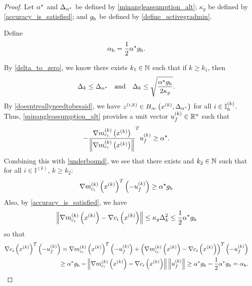 \begin{proof}

Let 
${ \alpha^{\star} }$ and ${\Delta_{\alpha^{\star}}}$ be defined by \cref{minangleassumption_alt};
$\kappa_g$ be defined by \cref{accuracy_is_satisfied}; 
and ${ g_{\textrm{h}} }$ be defined by \cref{define_activegradmin}.

Define 
\begin{align}
{ \alpha_{\textrm{h}} } = \frac 1 2 { \alpha^{\star} } { g_{\textrm{h}} }. \label{define_minactivealpha}
\end{align}

By \cref{delta_to_zero}, we know there exists $k_1 \in \mathbb N$ such that if $k \ge k_1$, then
\begin{align*}
\Delta_k \le {\Delta_{\alpha^{\star}}} \quad \textrm{and} \quad  \Delta_k \le \sqrt{\frac {{ \alpha^{\star} } { g_{\textrm{h}} }} {2 \kappa_g}}.
\end{align*}
By \cref{doesntreallyneedtobesaid}, we have ${z^{(i, k)}} \in B_{\infty}\left(x^{(k)}, {\Delta_{\alpha^{\star}}} \right)$ for all $i \in { \mathbb I_h^{(k)} }$.
Thus, \cref{minangleassumption_alt} provides a unit vector ${u^{(k)}_f}\in\mathbb R^n$ such that
\begin{align*}
-\frac {{\nabla m_{c_i}^{(k)}\left(x^{(k)}\right)}}{\left\|{\nabla m_{c_i}^{(k)}\left(x^{(k)}\right)}\right\|} ^T{u^{(k)}_f} \ge { \alpha^{\star} }.
\end{align*}
Combining this with \cref{underbound}, we see that there exists and $k_2 \in \mathbb N$ such that for all $i \in \mathbb I^{(k)}$, $k \ge k_2$:
\begin{align*}
 {\nabla m_{c_i}^{(k)}\left(x^{(k)}\right)}^T\left(-{u^{(k)}_f}\right) \ge { \alpha^{\star} } { g_{\textrm{h}} }
\end{align*}
Also, by \cref{accuracy_is_satisfied}, we have
\begin{align*}
\left\|{\nabla m_{c_i}^{(k)}\left(x^{(k)}\right)} - \nabla c_i\left(x^{(k)}\right) \right\| \le \kappa_g \Delta_k^2 \le \frac 1 2 { \alpha^{\star} } { g_{\textrm{h}} }
\end{align*}
so that
\begin{align*}
\nabla c_i\left(x^{(k)}\right)^T \left(-{u^{(k)}_f}\right) = 
{\nabla m_{c_i}^{(k)}\left(x^{(k)}\right)}^T\left(-{u^{(k)}_f}\right) + \left({\nabla m_{c_i}^{(k)}\left(x^{(k)}\right)} - \nabla c_i\left(x^{(k)}\right) \right)^T\left(-{u^{(k)}_f}\right) \\
\ge { \alpha^{\star} } { g_{\textrm{h}} } - \left\|{\nabla m_{c_i}^{(k)}\left(x^{(k)}\right)} - \nabla c_i\left(x^{(k)}\right) \right\|\left\|{u^{(k)}_f}\right\|
\ge { \alpha^{\star} } { g_{\textrm{h}} } - \frac 1 2 { \alpha^{\star} } { g_{\textrm{h}} } = { \alpha_{\textrm{h}} }.
\end{align*}


\end{proof}
